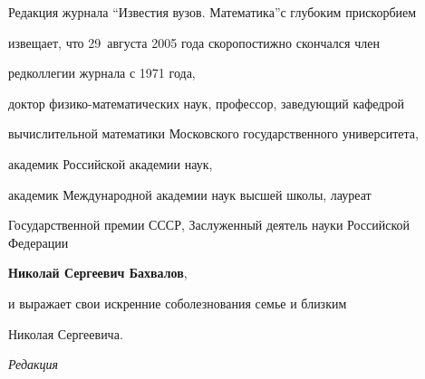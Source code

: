 




\hoffset=-8mm


\pagestyle{empty}





\vspace*{1cm}





Редакция журнала ``Известия вузов. Математика''с глубоким прискорбием


извещает, что 29~августа 2005 года скоропостижно скончался член 


редколлегии журнала с 1971 года,


доктор физико-математических наук, профессор, заведующий кафедрой 


вычислительной математики Московского государственного университета,


академик Российской академии наук,


академик Международной академии наук высшей школы, лауреат


Государственной премии СССР, Заслуженный деятель науки Российской Федерации


\medskip


\begin{center}


{\bf Николай Сергеевич Бахвалов},


\end{center}


\medskip





\noindent{}и выражает свои искренние соболезнования семье и близким


Николая Сергеевича.


\medskip





\hfill {\it Редакция}














